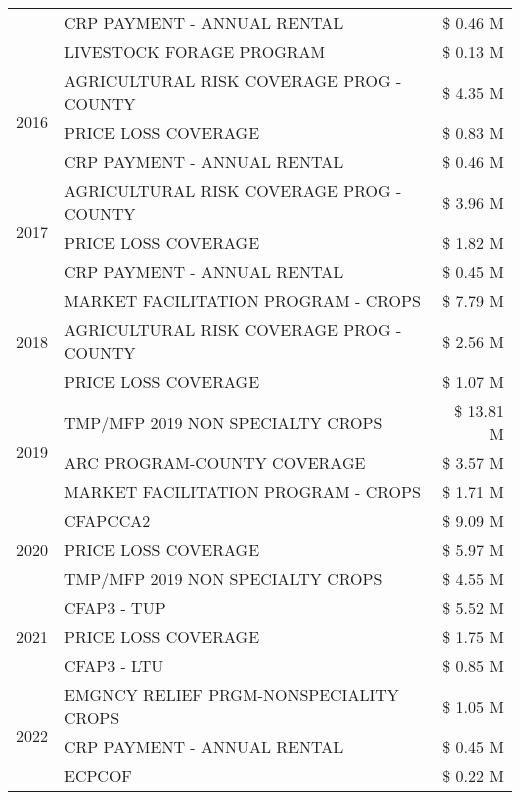 \begin{tabular}{llr}
 & CRP PAYMENT - ANNUAL RENTAL & \$ 0.46 M \\
 & LIVESTOCK FORAGE PROGRAM & \$ 0.13 M \\
\cline{1-3}
\multirow[t]{3}{*}{2016} & AGRICULTURAL RISK COVERAGE PROG - COUNTY & \$ 4.35 M \\
 & PRICE LOSS COVERAGE & \$ 0.83 M \\
 & CRP PAYMENT - ANNUAL RENTAL & \$ 0.46 M \\
\cline{1-3}
\multirow[t]{3}{*}{2017} & AGRICULTURAL RISK COVERAGE PROG - COUNTY & \$ 3.96 M \\
 & PRICE LOSS COVERAGE & \$ 1.82 M \\
 & CRP PAYMENT - ANNUAL RENTAL & \$ 0.45 M \\
\cline{1-3}
\multirow[t]{3}{*}{2018} & MARKET FACILITATION PROGRAM - CROPS & \$ 7.79 M \\
 & AGRICULTURAL RISK COVERAGE PROG - COUNTY & \$ 2.56 M \\
 & PRICE LOSS COVERAGE & \$ 1.07 M \\
\cline{1-3}
\multirow[t]{3}{*}{2019} & TMP/MFP 2019 NON SPECIALTY CROPS & \$ 13.81 M \\
 & ARC PROGRAM-COUNTY COVERAGE & \$ 3.57 M \\
 & MARKET FACILITATION PROGRAM - CROPS & \$ 1.71 M \\
\cline{1-3}
\multirow[t]{3}{*}{2020} & CFAPCCA2 & \$ 9.09 M \\
 & PRICE LOSS COVERAGE & \$ 5.97 M \\
 & TMP/MFP 2019 NON SPECIALTY CROPS & \$ 4.55 M \\
\cline{1-3}
\multirow[t]{3}{*}{2021} & CFAP3 - TUP & \$ 5.52 M \\
 & PRICE LOSS COVERAGE & \$ 1.75 M \\
 & CFAP3 - LTU & \$ 0.85 M \\
\cline{1-3}
\multirow[t]{3}{*}{2022} & EMGNCY RELIEF PRGM-NONSPECIALITY CROPS & \$ 1.05 M \\
 & CRP PAYMENT - ANNUAL RENTAL & \$ 0.45 M \\
 & ECPCOF & \$ 0.22 M \\
\cline{1-3}
\bottomrule
\end{tabular}
